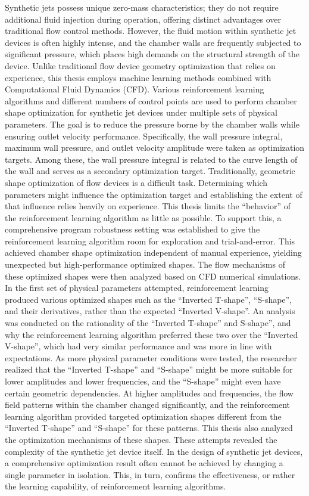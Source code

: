 \documentclass{article}
\begin{document}
Synthetic jets possess unique zero-mass characteristics; they do not require additional fluid injection during operation, offering distinct advantages over traditional flow control methods.
However, the fluid motion within synthetic jet devices is often highly intense, and the chamber walls are frequently subjected to significant pressure, which places high demands on the structural strength of the device.
Unlike traditional flow device geometry optimization that relies on experience, this thesis employs machine learning methods combined with Computational Fluid Dynamics (CFD).
Various reinforcement learning algorithms and different numbers of control points are used to perform chamber shape optimization for synthetic jet devices under multiple sets of physical parameters.
The goal is to reduce the pressure borne by the chamber walls while ensuring outlet velocity performance.
Specifically, the wall pressure integral, maximum wall pressure, and outlet velocity amplitude were taken as optimization targets.
Among these, the wall pressure integral is related to the curve length of the wall and serves as a secondary optimization target.
Traditionally, geometric shape optimization of flow devices is a difficult task.
Determining which parameters might influence the optimization target and establishing the extent of that influence relies heavily on experience.
This thesis limits the ``behavior'' of the reinforcement learning algorithm as little as possible.
To support this, a comprehensive program robustness setting was established to give the reinforcement learning algorithm room for exploration and trial-and-error.
This achieved chamber shape optimization independent of manual experience, yielding unexpected but high-performance optimized shapes.
The flow mechanisms of these optimized shapes were then analyzed based on CFD numerical simulations.
In the first set of physical parameters attempted, reinforcement learning produced various optimized shapes such as the ``Inverted T-shape'', ``S-shape'', and their derivatives, rather than the expected ``Inverted V-shape''.
An analysis was conducted on the rationality of the ``Inverted T-shape'' and S-shape'', and why the reinforcement learning algorithm preferred these two over the ``Inverted V-shape'', which had very similar performance and was more in line with expectations.
As more physical parameter conditions were tested, the researcher realized that the ``Inverted T-shape'' and ``S-shape'' might be more suitable for lower amplitudes and lower frequencies, and the ``S-shape'' might even have certain geometric dependencies.
At higher amplitudes and frequencies, the flow field patterns within the chamber changed significantly, and the reinforcement learning algorithm provided targeted optimization shapes different from the ``Inverted T-shape'' and ``S-shape'' for these patterns.
This thesis also analyzed the optimization mechanisms of these shapes.
These attempts revealed the complexity of the synthetic jet device itself.
In the design of synthetic jet devices, a comprehensive optimization result often cannot be achieved by changing a single parameter in isolation.
This, in turn, confirms the effectiveness, or rather the learning capability, of reinforcement learning algorithms.
\end{document}
